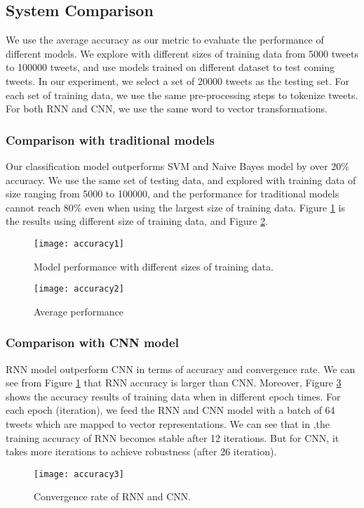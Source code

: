 \subsection{System Comparison}

We use the average accuracy as our metric to evaluate the performance of different models.
%
We explore with different sizes of training data from 5000 tweets to 100000 tweets, and use models trained on different dataset to test coming tweets. 
%
In our experiment, we select a set of 20000 tweets as the testing set.
%
For each set of training data, we use the same pre-processing steps to tokenize tweets.
%
For both RNN and CNN, we use the same word to vector transformations.

\subsubsection{Comparison with traditional models}
Our classification model outperforms SVM and Naive Bayes model by over 20\% accuracy. We use the same set of testing data, and explored with training data of size ranging from 5000 to 100000, and the performance for traditional models cannot reach 80\% even when using the largest size of training data. Figure \ref{fig:acc1} is the results using different size of training data, and Figure \ref{fig:acc2}.
 \begin{figure}[htb]
	\centering
	\texttt{[image: accuracy1]}
	\caption{Model performance with different sizes of training data.}
	\label{fig:acc1}
\end{figure} 
 \begin{figure}[htb]
	\centering
	\texttt{[image: accuracy2]}
	\caption{Average performance}
	\label{fig:acc2}
\end{figure} 

\subsubsection{Comparison with CNN model}
RNN model outperform CNN in terms of accuracy and convergence rate. 
%
We can see from Figure \ref{fig:acc1} that RNN accuracy is larger than CNN.
%
Moreover,  Figure \ref{fig:acc3} shows the accuracy results of training data when in different epoch times. For each epoch (iteration), we feed the RNN and CNN model with a batch of 64 tweets which are mapped to vector representations.
%
We can see that in ,the training accuracy of RNN becomes stable after 12 iterations. But for CNN, it takes more iterations to achieve robustness (after 26 iteration).
% 

 \begin{figure}[htb]
	\centering
	\texttt{[image: accuracy3]}
	\caption{Convergence rate of RNN and CNN.}
	\label{fig:acc3}
\end{figure} 


 

